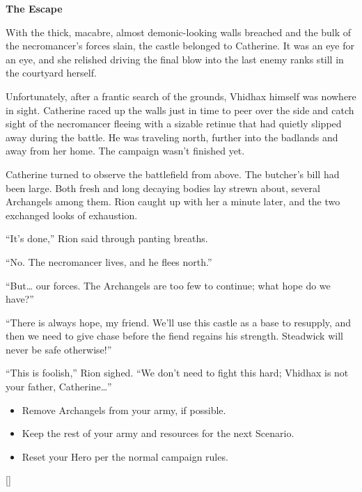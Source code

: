 \begin{multicols*}{2}
\textbf{The Escape}

With the thick, macabre, almost demonic-looking walls breached and the bulk of the necromancer's forces slain, the castle belonged to Catherine. It was an eye for an eye, and she relished driving the final blow into the last enemy ranks still in the courtyard herself. 

Unfortunately, after a frantic search of the grounds, Vhidhax himself was nowhere in sight. Catherine raced up the walls just in time to peer over the side and catch sight of the necromancer fleeing with a sizable retinue that had quietly slipped away during the battle. He was traveling north, further into the badlands and away from her home. The campaign wasn't finished yet.

Catherine turned to observe the battlefield from above. The butcher's bill had been large. Both fresh and long decaying bodies lay strewn about, several Archangels among them. Rion caught up with her a minute later, and the two exchanged looks of exhaustion.

``It's done,'' Rion said through panting breaths.

``No. The necromancer lives, and he flees north.''

``But… our forces. The Archangels are too few to continue; what hope do we have?''

``There is always hope, my friend. We'll use this castle as a base to resupply, and then we need to give chase before the fiend regains his strength. Steadwick will never be safe otherwise!''

``This is foolish,'' Rion sighed. ``We don't need to fight this hard; Vhidhax is not your father, Catherine…''

\begin{itemize}
  \item \textcolor{darkcandyapplered}{Remove Archangels from your army, if possible.}
  \item \textcolor{darkcandyapplered}{Keep the rest of your army and resources for the next Scenario.}
  \item \textcolor{darkcandyapplered}{Reset your Hero per the normal campaign rules.}
\end{itemize}

\vspace{2em}
\begin{center}
  \raisebox{0pt}[\dimexpr{}\baselineskip\relax]{}
\end{center}

\end{multicols*}
